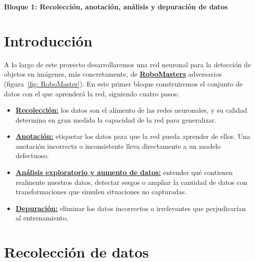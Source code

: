 \documentclass[12pt,a4paper]{article}
\begin{document}
\begin{center}
    \vspace*{.15cm}
    {\Huge \bfseries Bloque 1: Recolección, anotación, análisis y depuración de datos} \\[0.5cm]
\end{center}


\section{Introducción}

A lo largo de este proyecto desarrollaremos una red neuronal para la detección de objetos en imágenes, más concretamente, de \underline{\textbf{RoboMasters}} adversarios (figura~\ref{fig: RoboMaster}). En este primer bloque construiremos el conjunto de datos con el que aprenderá la red, siguiendo cuatro pasos:

\begin{itemize}
    \item \underline{\textbf{Recolección:}} los datos son el alimento de las redes neuronales, y su calidad determina en gran medida la capacidad de la red para generalizar.
    \item \underline{\textbf{Anotación:}} etiquetar los datos para que la red pueda aprender de ellos. Una anotación incorrecta o inconsistente lleva directamente a un modelo defectuoso.
    \item \underline{\textbf{Análisis exploratorio y aumento de datos:}} entender qué contienen realmente nuestros datos, detectar sesgos o ampliar la cantidad de datos con transformaciones que simulen situaciones no capturadas.
    \item \underline{\textbf{Depuración:}} eliminar los datos incorrectos o irrelevantes que perjudicarían al entrenamiento.
\end{itemize}


\section{Recolección de datos}
\end{document}
